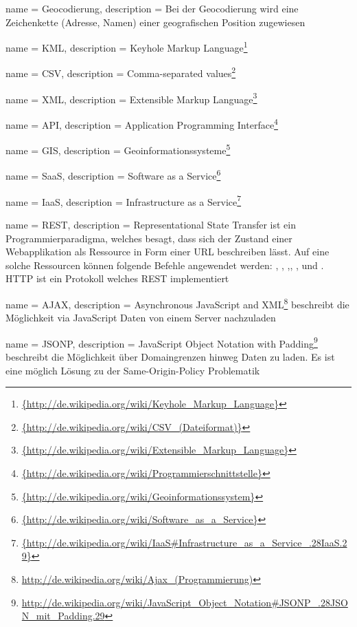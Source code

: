  {
	name = Geocodierung,
	description = {Bei der Geocodierung wird eine Zeichenkette (Adresse, Namen) einer geografischen Position zugewiesen}
}

 {
	name = KML,
	description = {Keyhole Markup Language\footnote{\url{{http://de.wikipedia.org/wiki/Keyhole_Markup_Language}}}}
}

 {
	name = CSV,
	description = {Comma-separated values\footnote{\url{{http://de.wikipedia.org/wiki/CSV_(Dateiformat)}}}}
}

 {
	name = XML,
	description = {Extensible Markup Language\footnote{\url{{http://de.wikipedia.org/wiki/Extensible_Markup_Language}}}}
}

 {
	name = API,
	description = {Application Programming Interface\footnote{\url{{http://de.wikipedia.org/wiki/Programmierschnittstelle}}}}
}

 {
	name = GIS,
	description = {Geoinformationssysteme\footnote{\url{{http://de.wikipedia.org/wiki/Geoinformationssystem}}}}
}

 {
	name = SaaS,
	description = {Software as a Service\footnote{\url{{http://de.wikipedia.org/wiki/Software_as_a_Service}}}}
}

 {
	name = IaaS,
	description = {Infrastructure as a Service\footnote{\url{{http://de.wikipedia.org/wiki/IaaS\#Infrastructure_as_a_Service_.28IaaS.29}}}}
}

 {
	name = REST,
	description = {Representational State Transfer\cite{rest} ist ein Programmierparadigma, welches besagt, dass sich der Zustand einer Webapplikation als Ressource in Form einer URL beschreiben lässt. Auf eine solche Ressourcen können folgende Befehle angewendet werden: , , ,, ,  und . HTTP ist ein Protokoll welches REST implementiert}
}

 {
	name = AJAX,
	description = {Asynchronous JavaScript and XML\footnote{\url{http://de.wikipedia.org/wiki/Ajax_(Programmierung)}} beschreibt die Möglichkeit via JavaScript Daten von einem Server nachzuladen}
}

 {
	name = JSONP,
	description = {JavaScript Object Notation with Padding\footnote{\url{http://de.wikipedia.org/wiki/JavaScript_Object_Notation\#JSONP_.28JSON_mit_Padding.29}} beschreibt die Möglichkeit über Domaingrenzen hinweg Daten zu laden. Es ist eine möglich Lösung zu der Same-Origin-Policy Problematik\cite{sop}}
}

